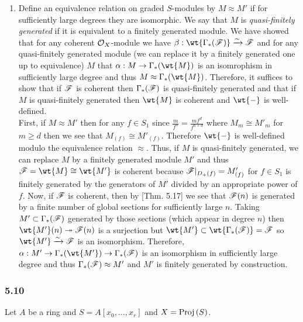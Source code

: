 \documentclass[12pt]{article}
\begin{document}
\begin{enumerate}
\item Define an equivalence relation on graded $S$-modules by $M \approx M'$ if for sufficiently large degrees they are isomorphic. We say that $M$ is \textit{quasi-finitely generated} if it is equivalent to a finitely generated module. We have showed that for any coherent $\mathcal{O}_{X}$-module we have $\beta : \wt{\Gamma_*(\F)} \iso \F$ and for any quasi-finitely generated module (we can replace it by a finitely generated one up to equivalence) $M$ that $\alpha : M \to \Gamma_*(\wt{M})$ is an isomrophism in sufficiently large degree and thus $M \approx \Gamma_*(\wt{M})$. Therefore, it suffices to show that if $\mathscr{F}$ is coherent then $\Gamma_*(\mathscr{F})$ is quasi-finitely generated and that if $M$ is quasi-finitely generated then $\wt{M}$ is coherent and $\wt{-}$ is well-defined. 
\bigskip\\
First, if $M \approx M'$ then for any $f \in S_1$ since $\frac{m}{f^n} = \frac{m f^d}{f^{n+d}}$ where $M_m \cong M'_m$ for $m \ge d$ then we see that $M_{(f)} \cong M'_{(f)}$. Therefore $\wt{-}$ is well-defined modulo the equivalence relation $\approx$. Thus, if $M$ is quasi-finitely generated, we can replace $M$ by a finitely generated module $M'$ and thus $\F = \wt{M} \cong \wt{M'}$ is coherent because $\mathscr{F}|_{D_+(f)} = M'_{(f)}$ for $f \in S_1$ is finitely generated by the generators of $M'$ divided by an appropriate power of $f$. Now, if $\mathscr{F}$ is coherent, then by [Thm. 5.17] we see that $\mathscr{F}(n)$ is generated by a finite number of global sections for sufficiently large $n$. Taking $M' \subset \Gamma_*(\mathscr{F})$ generated by those sections (which appear in degree $n$) then $\wt{M'}(n) \onto \F(n)$ is a surjection but $\wt{M'} \subset \wt{\Gamma_*(\F)} = \F$ so $\wt{M'} \iso \F$ is an isomorphism. Therefore, $\alpha : M' \to  \Gamma_*(\wt{M'}) \to \Gamma_*(\F)$ is an isomorphism in sufficiently large degree and thus $\Gamma_*(\mathscr{F}) \approx M'$ and $M'$ is finitely generated by construction. 
\end{enumerate}

\subsubsection{5.10}

Let $A$ be a ring and $S = A[x_0, \dots, x_r]$ and $X = \mathrm{Proj}\left( S \right)$. 
\end{document}

